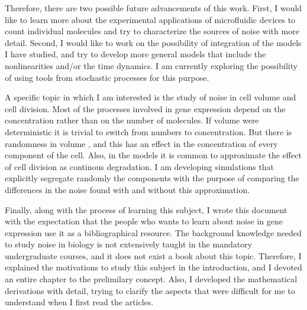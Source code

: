 Therefore, there are two possible future advancements of this work. First, I would like to learn more about the experimental applications of microfluidic devices to count individual molecules and try to characterize the sources of noise with more detail. Second, I would like to work on the possibility of integration of the models I have studied, and try to develop more general models that include the nonlinearities and/or the time dynamics. I am currently exploring the possibility of using tools from stochastic processes for this purpose.

A specific topic in which I am interested is the study of noise in cell volume and cell division. Most of the processes involved in gene expression depend on the concentration rather than on the number of molecules. If volume were deterministic it is trivial to switch from numbers to concentration. But there is randomness in volume \cite{tanouchi15}, and this has an effect in the concentration of every component of the cell. Also, in the models it is common to approximate the effect of cell division as continous degradation. I am developing simulations that explicitly segregate randomly the components with the purpose of comparing the differences in the noise found with and without this approximation.

Finally, along with the process of learning this subject, I wrote this document with the expectation that the people who wants to learn about noise in gene expression use it as a bibliographical resource. The background knowledge needed to study noise in biology is not extensively taught in the mandatory undergraduate courses, and it does not exist a book about this topic. Therefore, I explained the motivations to study this subject in the introduction, and I devoted an entire chapter to the prelimilary concept. Also, I developed the mathematical derivations with detail, trying to clarify the aspects that were difficult for me to understand when I first read the articles.



